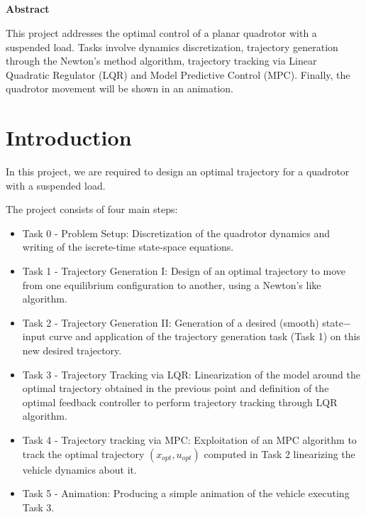 \documentclass[a4paper,11pt,oneside]{book}
\begin{document}
\newpage
\thispagestyle{empty}

\begin{center}
\chapter*{}
\thispagestyle{empty}
{\Huge \textbf{Abstract}}\\
\vspace{15mm}

This project addresses the optimal control of a planar quadrotor with a suspended load. Tasks involve dynamics discretization, trajectory generation through the Newton's method algorithm, trajectory tracking via Linear Quadratic Regulator (LQR) and Model Predictive Control (MPC).
Finally, the quadrotor movement will be shown in an animation.
\end{center}

\tableofcontents \thispagestyle{empty}

\chapter*{Introduction}

In this project, we are required to design an optimal trajectory for a quadrotor with a suspended load. 

The project consists of four main steps:
\begin{itemize}
  \item Task 0 - Problem Setup:
Discretization of the quadrotor dynamics and writing of the iscrete-time state-space equations.
  \item Task 1 - Trajectory Generation I:
Design of an optimal trajectory to move from one equilibrium configuration to another, using a Newton's like algorithm.
  \item Task 2 - Trajectory Generation II:
Generation of a desired (smooth) state$-$input curve and
application of the trajectory generation task (Task 1) on this new desired trajectory.
    \item Task 3 - Trajectory Tracking via LQR:
Linearization of the model around the optimal trajectory obtained in the previous point and definition of the optimal feedback controller to perform trajectory tracking through LQR algorithm.
    \item Task 4 - Trajectory
tracking via MPC: Exploitation of an MPC algorithm to track the optimal trajectory $(x_{opt}, u_{opt})$ computed in Task 2 linearizing the vehicle dynamics about it.
    \item Task 5 - Animation:
Producing a simple animation of the vehicle executing Task 3.
\end{itemize}
\end{document}
